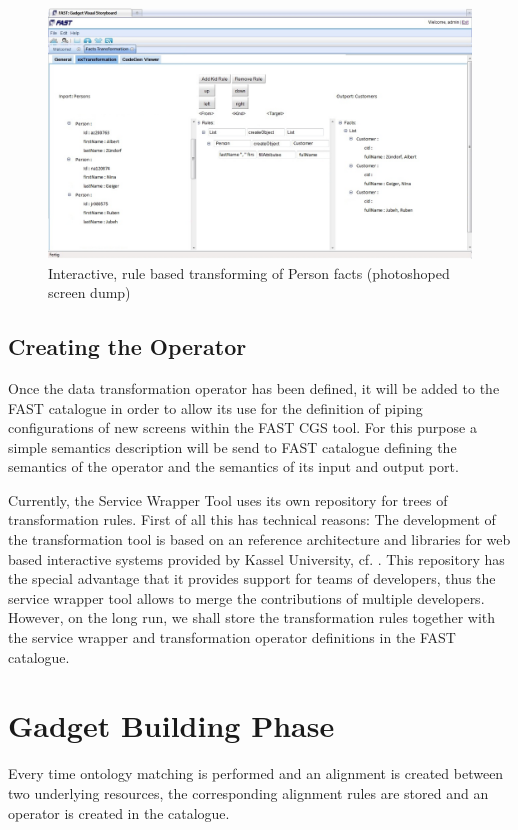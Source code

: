 \begin{figure}
  \begin{center}
\includegraphics[angle=90,width=0.8\linewidth]{images/FactsTransformationToolGVSWithTransformationRules.jpg}
    \caption{Interactive, rule based transforming of Person facts (photoshoped screen dump)}
    \label{fig:FactsTransformationToolTransformationRules}
  \end{center}
\end{figure}


\subsection{Creating the Operator}

Once the data transformation operator has been defined, it will be added to the FAST catalogue in order to allow its use for the definition of piping configurations of new screens within the FAST CGS tool. For this purpose a simple semantics description will be send to FAST catalogue defining the semantics of the operator and the semantics of its input and output port.

Currently, the Service Wrapper Tool uses its own repository for trees of transformation rules. First of all this has technical reasons: The development of the transformation tool is based on an reference architecture and libraries for web based interactive systems provided by Kassel University, cf. \cite{AsDH2009CVSM}. This repository has the special advantage that it provides support for teams of developers, thus the service wrapper tool allows to merge the contributions of multiple developers. However, on the long run, we shall store the transformation rules together with the service wrapper and transformation operator definitions in the FAST catalogue.  


\section{Gadget Building Phase}
\label{sec:gadgetbuilding}
Every time ontology matching is performed and an alignment is created between two underlying resources, the corresponding alignment rules are stored and an operator is created in the catalogue. 

